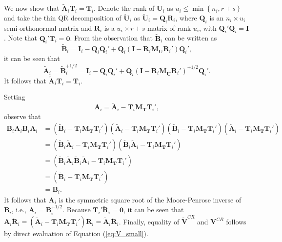 \documentclass[12pt]{article}
\begin{document}
We now show that \(\tilde{\mathbf{A}}_i \mathbf{T}_i = \mathbf{T}_i\).
Denote the rank of \(\mathbf{\ddot{U}}_i\) as
\(u_i \leq \min \left\{n_i, r + s \right\}\) and take the thin QR
decomposition of \(\mathbf{\ddot{U}}_i\) as
\(\mathbf{\ddot{U}}_i = \mathbf{Q}_i \mathbf{R}_i\), where
\(\mathbf{Q}_i\) is an \(n_i \times u_i\) semi-orthonormal matrix and
\(\mathbf{R}_i\) is a \(u_i \times r + s\) matrix of rank \(u_i\), with
\(\mathbf{Q}_i'\mathbf{Q}_i = \mathbf{I}\). Note that
\(\mathbf{Q}_i'\mathbf{T}_i = \mathbf{0}\). From the observation that
\(\tilde{\mathbf{B}}_i\) can be written as \[
\tilde{\mathbf{B}}_i = \mathbf{I}_i - \mathbf{Q}_i \mathbf{Q}_i' + \mathbf{Q}_i \left(\mathbf{I} - \mathbf{R}_i \mathbf{M}_{\mathbf{\ddot{U}}} \mathbf{R}_i'\right)\mathbf{Q}_i',
\] it can be seen that \begin{equation}
\tilde{\mathbf{A}}_i = \tilde{\mathbf{B}}_i^{+1/2} = \mathbf{I}_i - \mathbf{Q}_i \mathbf{Q}_i' + \mathbf{Q}_i \left(\mathbf{I} - \mathbf{R}_i \mathbf{M}_{\mathbf{\ddot{U}}} \mathbf{R}_i'\right)^{+1/2} \mathbf{Q}_i'.
\end{equation} It follows that
\(\tilde{\mathbf{A}}_i \mathbf{T}_i = \mathbf{T}_i\).

Setting \begin{equation}
\mathbf{A}_i = \tilde{\mathbf{A}}_i - \mathbf{T}_i \mathbf{M_T}\mathbf{T}_i',
\end{equation} observe that \begin{align*}
\mathbf{B}_i \mathbf{A}_i \mathbf{B}_i \mathbf{A}_i &= \left(\tilde{\mathbf{B}}_i - \mathbf{T}_i \mathbf{M_T}\mathbf{T}_i'\right) \left(\tilde{\mathbf{A}}_i - \mathbf{T}_i \mathbf{M_T}\mathbf{T}_i'\right)\left(\tilde{\mathbf{B}}_i - \mathbf{T}_i \mathbf{M_T}\mathbf{T}_i'\right) \left(\tilde{\mathbf{A}}_i - \mathbf{T}_i \mathbf{M_T}\mathbf{T}_i'\right) \\
&= \left(\tilde{\mathbf{B}}_i\tilde{\mathbf{A}}_i - \mathbf{T}_i \mathbf{M_T}\mathbf{T}_i'\right)\left(\tilde{\mathbf{B}}_i\tilde{\mathbf{A}}_i - \mathbf{T}_i \mathbf{M_T}\mathbf{T}_i'\right) \\
&= \left(\tilde{\mathbf{B}}_i\tilde{\mathbf{A}}_i\tilde{\mathbf{B}}_i\tilde{\mathbf{A}}_i - \mathbf{T}_i \mathbf{M_T}\mathbf{T}_i'\right) \\
&= \left(\tilde{\mathbf{B}}_i - \mathbf{T}_i \mathbf{M_T}\mathbf{T}_i'\right) \\
&= \mathbf{B}_i.
\end{align*} It follows that \(\mathbf{A}_i\) is the symmetric square
root of the Moore-Penrose inverse of \(\mathbf{B}_i\), i.e.,
\(\mathbf{A}_i = \mathbf{B}_i^{+1/2}\). Because
\(\mathbf{T}_i ' \mathbf{\ddot{R}}_i= \mathbf{0}\), it can be seen that
\(\mathbf{A}_i \mathbf{\ddot{R}}_i = \left(\tilde{\mathbf{A}}_i - \mathbf{T}_i \mathbf{M_T}\mathbf{T}_i'\right)\mathbf{\ddot{R}}_i = \tilde{\mathbf{A}}_i \mathbf{\ddot{R}}_i\).
Finally, equality of \(\mathbf{\tilde{V}}^{CR}\) and \(\mathbf{V}^{CR}\)
follows by direct evaluation of Equation (\ref{eq:V_small}).
\end{document}
